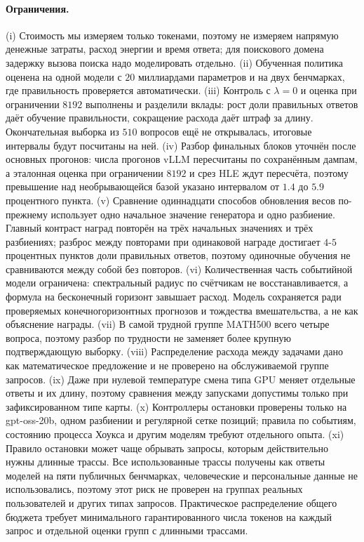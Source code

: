 \documentclass[11pt]{article}
\begin{document}
\paragraph{Ограничения.} (i) Стоимость мы измеряем только токенами, поэтому не измеряем напрямую денежные затраты, расход энергии и время ответа; для поискового домена задержку вызова поиска надо моделировать отдельно. (ii) Обученная политика оценена на одной модели с $20$ миллиардами параметров и на двух бенчмарках, где правильность проверяется автоматически. (iii) Контроль с $\lambda=0$ и оценка при ограничении $8192$ выполнены и разделили вклады: рост доли правильных ответов даёт обучение правильности, сокращение расхода даёт штраф за длину. Окончательная выборка из $510$ вопросов ещё не открывалась, итоговые интервалы будут посчитаны на ней. (iv) Разбор финальных блоков уточнён после основных прогонов: числа прогонов vLLM пересчитаны по сохранённым дампам, а эталонная оценка при ограничении $8192$ и срез HLE ждут пересчёта, поэтому превышение над необрывающейся базой указано интервалом от $1.4$ до $5.9$ процентного пункта. (v) Сравнение одиннадцати способов обновления весов по-прежнему использует одно начальное значение генератора и одно разбиение. Главный контраст наград повторён на трёх начальных значениях и трёх разбиениях; разброс между повторами при одинаковой награде достигает $4$-$5$ процентных пунктов доли правильных ответов, поэтому одиночные обучения не сравниваются между собой без повторов. (vi) Количественная часть событийной модели ограничена: спектральный радиус по счётчикам не восстанавливается, а формула на бесконечный горизонт завышает расход. Модель сохраняется ради проверяемых конечногоризонтных прогнозов и тождества вмешательства, а не как объяснение награды. (vii) В самой трудной группе MATH500 всего четыре вопроса, поэтому разбор по трудности не заменяет более крупную подтверждающую выборку. (viii) Распределение расхода между задачами дано как математическое предложение и не проверено на обслуживаемой группе запросов. (ix) Даже при нулевой температуре смена типа GPU меняет отдельные ответы и их длину, поэтому сравнения между запусками допустимы только при зафиксированном типе карты. (x) Контроллеры остановки проверены только на gpt-oss-20b, одном разбиении и регулярной сетке позиций; правила по событиям, состоянию процесса Хоукса и другим моделям требуют отдельного опыта. (xi) Правило остановки может чаще обрывать запросы, которым действительно нужны длинные трассы. Все использованные трассы получены как ответы моделей на пяти публичных бенчмарках, человеческие и персональные данные не использовались, поэтому этот риск не проверен на группах реальных пользователей и других типах запросов. Практическое распределение общего бюджета требует минимального гарантированного числа токенов на каждый запрос и отдельной оценки групп с длинными трассами.
\end{document}
